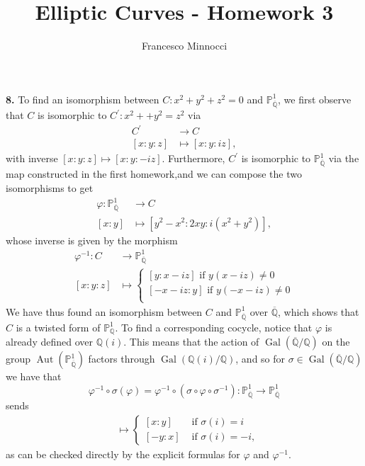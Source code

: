 \documentclass[a4paper]{article}
\title{Elliptic Curves - Homework 3}
\author{Francesco Minnocci}
\theoremstyle{definition}
\theoremstyle{definition}
\theoremstyle{remark}
\theoremstyle{definition}
\begin{document}
\maketitle

\noindent\textbf{8.}
To find an isomorphism between
$C: x^2+y^2+z^2=0$ and $\mathbb{P}^1_{\overline{\mathbb{Q}}}$, we first observe that $C$ is isomorphic to $C^\prime: x^2++y^2=z^2$ via
\begin{align*}
        C^\prime & \to C             \\
        [x:y:z]  & \mapsto [x:y:iz],
\end{align*}
with inverse $[x:y:z] \mapsto [x:y:-iz]$. Furthermore, $C^\prime$ is isomorphic to $\mathbb{P}^1_{\overline{\mathbb{Q}}}$ via the map constructed in the first homework,and we can compose the two isomorphisms to get
\begin{align*}
        \varphi:\mathbb{P}^1_{\overline{\mathbb{Q}}} & \to C                             \\
        [x:y]                                        & \mapsto [y^2-x^2:2xy:i(x^2+y^2)],
\end{align*}
whose inverse is given by the morphism
\begin{align*}
        \varphi^{-1}:C & \longrightarrow \mathbb{P}^1_{\overline{\mathbb{Q}}} \\
        [x:y:z]        & \longmapsto \begin{cases}
                                             [y:x-iz]\text{ if } y(x-iz)\neq 0   \\
                                             [-x-iz:y]\text{ if } y(-x-iz)\neq 0 \\
                                     \end{cases}
\end{align*}
We have thus found an isomorphism between $C$ and $\mathbb{P}^1_{\overline{\mathbb{Q}}}$ over $\overline{\mathbb{Q}}$, which shows that $C$ is a twisted form of $\mathbb{P}^1_\mathbb{Q}$. To find a corresponding cocycle, notice that $\varphi$ is already defined over $\mathbb{Q}(i)$. This means that the action of $\operatorname{Gal}(\overline{\mathbb{Q}}/\mathbb{Q})$ on the group $\operatorname{Aut}(\mathbb{P}^1_{\overline{\mathbb{Q}}})$ factors through $\operatorname{Gal}(\mathbb{Q}(i)/\mathbb{Q})$, and so
for $\sigma \in \operatorname{Gal}(\overline{\mathbb{Q}}/\mathbb{Q})$ we have that
\[
        \varphi^{-1}\circ \sigma(\varphi)=\varphi^{-1}\circ(\sigma\circ\varphi\circ\sigma^{-1}): \mathbb{P}^1_{\overline{\mathbb{Q}}}  \longrightarrow \mathbb{P}^1_{\overline{\mathbb{Q}}}
\]
sends
\begin{align*}
        [x:y] & \longmapsto \begin{cases}
                                    [x:y]  & \text{ if }   \sigma(i)=i  \\
                                    [-y:x] & \text{ if }  \sigma(i)=-i,
                            \end{cases}
\end{align*}
as can be checked directly by the explicit formulas for $\varphi$ and $\varphi^{-1}$.
\end{document}
